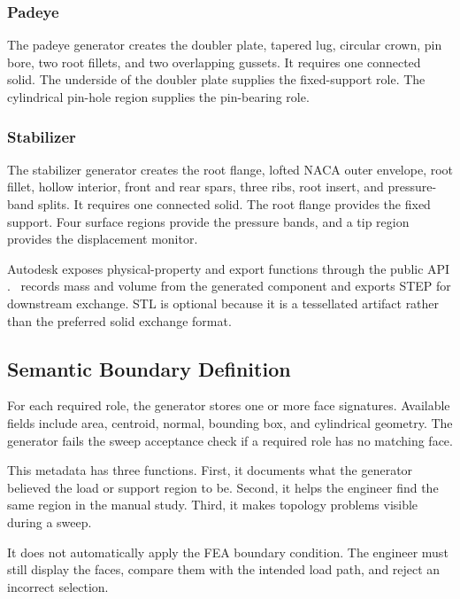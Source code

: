 \subsubsection{Padeye}

The padeye generator creates the doubler plate, tapered lug, circular crown,
pin bore, two root fillets, and two overlapping gussets. It requires one
connected solid. The underside of the doubler plate supplies the
fixed-support role. The cylindrical pin-hole region supplies the
pin-bearing role.

\subsubsection{Stabilizer}

The stabilizer generator creates the root flange, lofted NACA outer envelope,
root fillet, hollow interior, front and rear spars, three ribs, root insert,
and pressure-band splits. It requires one connected solid. The root flange
provides the fixed support. Four surface regions provide the pressure bands,
and a tip region provides the displacement monitor.

Autodesk exposes physical-property and export functions through the public API
\cite{autodeskPhysicalProperties,autodeskExport}. \NEMO\ records mass and
volume from the generated component and exports STEP for downstream exchange.
STL is optional because it is a tessellated artifact rather than the preferred
solid exchange format.

\subsection{Semantic Boundary Definition}
\label{sec:boundary-method}

For each required role, the generator stores one or more face signatures.
Available fields include area, centroid, normal, bounding box, and cylindrical
geometry. The generator fails the sweep acceptance check if a required role
has no matching face.

This metadata has three functions. First, it documents what the generator
believed the load or support region to be. Second, it helps the engineer find
the same region in the manual study. Third, it makes topology problems visible
during a sweep.

It does not automatically apply the FEA boundary condition. The engineer must
still display the faces, compare them with the intended load path, and reject
an incorrect selection.

